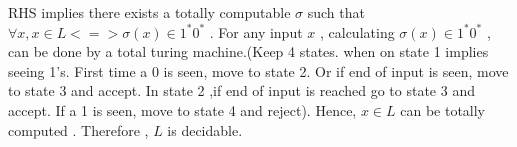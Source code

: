 \documentclass[addpoints,12pt]{exam}
\begin{document}
\begin{questions}
\begin{parts}
    RHS implies there exists a totally computable $\sigma$ such that $\forall x, x\in L <=> \sigma(x)\in1^\ast0^\ast$ . \newline
    For any input $x$ , calculating $\sigma(x)\in1^\ast0^\ast$ , can be done by a total turing machine.(Keep 4 states. when on state 1 implies seeing 1's. First time a 0 is seen,
    move to state 2. Or if end of input is seen, move to state 3 and accept. In state 2 ,if end of input is reached go to state 3 and accept. If a 1 is seen, move to state 4 and reject).
    Hence, $x\in L$ can be totally computed . Therefore , $L$ is decidable.
   
 \end{parts}

 
 
 \question
 
 
 
 \end{questions}
\end{document}
